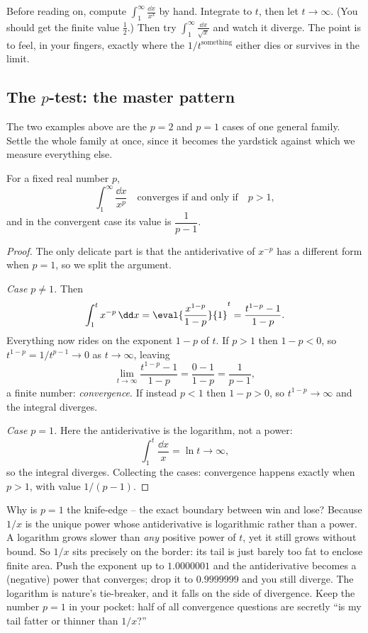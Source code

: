 \begin{labbox}
Before reading on, compute $\displaystyle\int_1^{\infty} \frac{\dd x}{x^{3}}$ by
hand. Integrate to $t$, then let $t\to\infty$. (You should get the finite value
$\tfrac12$.) Then try $\displaystyle\int_1^{\infty} \frac{\dd x}{\sqrt{x}}$ and
watch it diverge. The point is to feel, in your fingers, exactly where the
$1/t^{\text{something}}$ either dies or survives in the limit.
\end{labbox}

\subsection{The $p$-test: the master pattern}
\label{ch25:p-test}

The two examples above are the $p=2$ and $p=1$ cases of one general family. Settle
the whole family at once, since it becomes the yardstick against which we measure
everything else.

\begin{theorem}
\label{ch25:thm-p-infinity}
For a fixed real number $p$,
\[
  \int_1^{\infty} \frac{\dd x}{x^{p}}
  \quad\text{converges if and only if}\quad p > 1,
\]
and in the convergent case its value is $\dfrac{1}{p-1}$.
\end{theorem}

\begin{proof}
The only delicate part is that the antiderivative of $x^{-p}$ has a different form
when $p=1$, so we split the argument.

\emph{Case $p \ne 1$.} Then
\[
  \int_1^{t} x^{-p}\,\dd x
  = \eval{\frac{x^{1-p}}{1-p}}{1}^{t}
  = \frac{t^{1-p} - 1}{1-p}.
\]
Everything now rides on the exponent $1-p$ of $t$. If $p > 1$ then $1-p < 0$, so
$t^{1-p} = 1/t^{p-1} \to 0$ as $t\to\infty$, leaving
\[
  \lim_{t\to\infty}\frac{t^{1-p}-1}{1-p} = \frac{0-1}{1-p} = \frac{1}{p-1},
\]
a finite number: \emph{convergence}. If instead $p < 1$ then $1-p > 0$, so
$t^{1-p}\to\infty$ and the integral diverges.

\emph{Case $p = 1$.} Here the antiderivative is the logarithm, not a power:
\[
  \int_1^{t}\frac{\dd x}{x} = \ln t \to \infty,
\]
so the integral diverges. Collecting the cases: convergence happens exactly when
$p > 1$, with value $1/(p-1)$.
\end{proof}

\begin{whybox}
Why is $p=1$ the knife-edge -- the exact boundary between win and lose? Because
$1/x$ is the unique power whose antiderivative is logarithmic rather than a power.
A logarithm grows slower than \emph{any} positive power of $t$, yet it still grows
without bound. So $1/x$ sits precisely on the border: its tail is just barely too
fat to enclose finite area. Push the exponent up to $1.0000001$ and the
antiderivative becomes a (negative) power that converges; drop it to $0.9999999$
and you still diverge. The logarithm is nature's tie-breaker, and it falls on the
side of divergence. Keep the number $p=1$ in your pocket: half of all convergence
questions are secretly ``is my tail fatter or thinner than $1/x$?''
\end{whybox}


